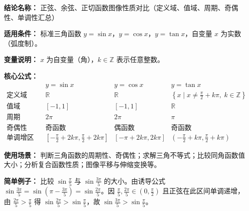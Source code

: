 \textbf{结论名称：} 正弦、余弦、正切函数图像性质对比（定义域、值域、周期、奇偶性、单调性汇总）

\textbf{适用条件：} 标准三角函数 \(y=\sin x\)，\(y=\cos x\)，\(y=\tan x\)，自变量 \(x\) 为实数（弧度制）。

\textbf{变量说明：} \(x\) 为自变量（角），\(k \in \mathbb{Z}\) 表示任意整数。

\textbf{核心公式：}
\[
\boxed{
\begin{array}{c|c|c|c}
& y=\sin x & y=\cos x & y=\tan x \\
\hline
\text{定义域} & \mathbb{R} & \mathbb{R} & \left\{x \mid x \neq \frac{\pi}{2}+k\pi,\; k\in\mathbb{Z}\right\} \\
\text{值域} & [-1,1] & [-1,1] & \mathbb{R} \\
\text{周期} & 2\pi & 2\pi & \pi \\
\text{奇偶性} & \text{奇函数} & \text{偶函数} & \text{奇函数} \\
\text{单调增区间} & \left[-\frac{\pi}{2}+2k\pi,\frac{\pi}{2}+2k\pi\right] & \left[-\pi+2k\pi,2k\pi\right] & \left(-\frac{\pi}{2}+k\pi,\frac{\pi}{2}+k\pi\right)
\end{array}
}
\]

\textbf{使用场景：} 判断三角函数的周期性、奇偶性；求解三角不等式；比较同角函数值大小；分析复合函数性质；图像平移与伸缩变换等。

\textbf{简单例子：} 比较 \(\sin\frac{\pi}{5}\) 与 \(\sin\frac{3\pi}{5}\) 的大小。由诱导公式 \(\sin\frac{3\pi}{5} = \sin\left(\pi-\frac{3\pi}{5}\right) = \sin\frac{2\pi}{5}\)。因 \(\frac{\pi}{5},\frac{2\pi}{5}\in\left(0,\frac{\pi}{2}\right)\) 且正弦在此区间单调递增，由 \(\frac{2\pi}{5} > \frac{\pi}{5}\) 得 \(\sin\frac{2\pi}{5} > \sin\frac{\pi}{5}\)，故 \(\sin\frac{3\pi}{5} > \sin\frac{\pi}{5}\)。